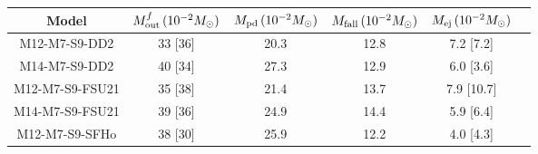 \begin{tabular}{c cc ccc}
	\toprule \toprule
	Model & $M_{\rm out}^f\,(10^{-2} M_\odot)$ & $M_{\rm pd}\,(10^{-2} M_\odot)$ & $M_{\rm fall}\,(10^{-2} M_\odot)$ & $M_{\rm ej}\,(10^{-2} M_\odot)$ \\
	\midrule
	M12-M7-S9-DD2 & 33 [36] & 20.3 & 12.8 & 7.2 [7.2] \\
	M14-M7-S9-DD2 & 40 [34] & 27.3 & 12.9 & 6.0 [3.6] \\
	M12-M7-S9-FSU21 & 35 [38] & 21.4 & 13.7 & 7.9 [10.7] \\
	M14-M7-S9-FSU21 & 39 [36] & 24.9 & 14.4 & 5.9 [6.4] \\
	M12-M7-S9-SFHo & 38 [30] & 25.9 & 12.2 & 4.0 [4.3] \\
	\bottomrule \bottomrule
\end{tabular}

